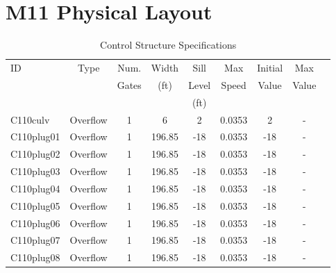 \section{M11 Physical Layout}

\scriptsize
\begin{table}[h]
\caption{Control Structure Specifications}
\label{tab:struc-specs1}
\begin{tabular}{@{}lcccccccc@{}}
\toprule
{ID}            & {Type}        & Num.     & Width       & Sill         & Max         & Initial         & Max       \\
                &               & Gates    & (ft)        & Level        & Speed       & Value           & Value     \\
                &               &          &             & (ft)         &             &                 &           \\
\hline
{C110culv}      & Overflow      & 1        & 6           & 2            & 0.0353      & 2               & -            \\
{C110plug01}    & Overflow      & 1        & 196.85      & -18          & 0.0353      & -18             & -            \\
{C110plug02}    & Overflow      & 1        & 196.85      & -18          & 0.0353      & -18             & -            \\
{C110plug03}    & Overflow      & 1        & 196.85      & -18          & 0.0353      & -18             & -            \\
{C110plug04}    & Overflow      & 1        & 196.85      & -18          & 0.0353      & -18             & -            \\
{C110plug05}    & Overflow      & 1        & 196.85      & -18          & 0.0353      & -18             & -            \\
{C110plug06}    & Overflow      & 1        & 196.85      & -18          & 0.0353      & -18             & -            \\
{C110plug07}    & Overflow      & 1        & 196.85      & -18          & 0.0353      & -18             & -            \\
{C110plug08}    & Overflow      & 1        & 196.85      & -18          & 0.0353      & -18             & -            \\

\end{tabular}
\end{table}
